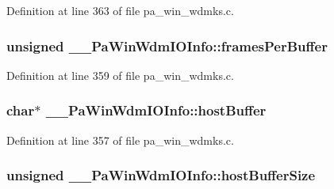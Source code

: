 Definition at line 363 of file pa\+\_\+win\+\_\+wdmks.\+c.

\subsubsection[{\texorpdfstring{frames\+Per\+Buffer}{framesPerBuffer}}]{\setlength{\rightskip}{0pt plus 5cm}unsigned \+\_\+\+\_\+\+Pa\+Win\+Wdm\+I\+O\+Info\+::frames\+Per\+Buffer}\hypertarget{struct_____pa_win_wdm_i_o_info_ad80e8655e6f5dae1c751a2345d03456a}{}\label{struct_____pa_win_wdm_i_o_info_ad80e8655e6f5dae1c751a2345d03456a}


Definition at line 359 of file pa\+\_\+win\+\_\+wdmks.\+c.

\subsubsection[{\texorpdfstring{host\+Buffer}{hostBuffer}}]{\setlength{\rightskip}{0pt plus 5cm}char$\ast$ \+\_\+\+\_\+\+Pa\+Win\+Wdm\+I\+O\+Info\+::host\+Buffer}\hypertarget{struct_____pa_win_wdm_i_o_info_ab2726db73e01500b5088f535ac766738}{}\label{struct_____pa_win_wdm_i_o_info_ab2726db73e01500b5088f535ac766738}


Definition at line 357 of file pa\+\_\+win\+\_\+wdmks.\+c.

\subsubsection[{\texorpdfstring{host\+Buffer\+Size}{hostBufferSize}}]{\setlength{\rightskip}{0pt plus 5cm}unsigned \+\_\+\+\_\+\+Pa\+Win\+Wdm\+I\+O\+Info\+::host\+Buffer\+Size}\hypertarget{struct_____pa_win_wdm_i_o_info_a6d8bb24a84a455a3621d7d357160fc39}{}\label{struct_____pa_win_wdm_i_o_info_a6d8bb24a84a455a3621d7d357160fc39}


